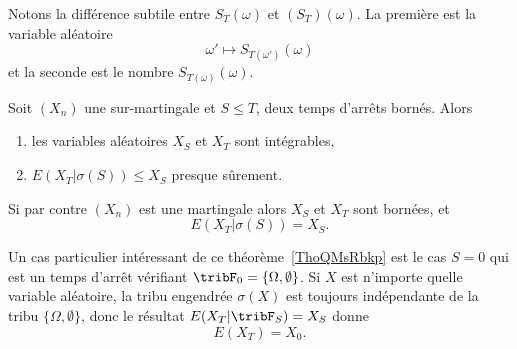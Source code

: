 \begin{remark}
    Notons la différence subtile entre \( S_T(\omega)\) et \( (S_T)(\omega)\). La première est la variable aléatoire
    \begin{equation}
        \omega'\mapsto S_{T(\omega')}(\omega)
    \end{equation}
    et la seconde est le nombre \( S_{T(\omega)}(\omega)\).
\end{remark}

\begin{theorem}   \label{ThoQMsRbkp}
    Soit \( (X_n)\) une sur-martingale et \( S\leq T\), deux temps d'arrêts bornés. Alors
    \begin{enumerate}
        \item
            les variables aléatoires \( X_{S}\) et \( X_{T}\) sont intégrables,
        \item
            \( E(X_{T}|  \sigma(S) )\leq X_{S}\) presque sûrement.
    \end{enumerate}
    Si par contre \( (X_n)\) est une martingale alors \( X_{S}\) et \( X_{T}\) sont bornées, et
    \begin{equation}
        E(X_{T}|\sigma(S))=X_{S}.
    \end{equation}
\end{theorem}
\begin{remark}  \label{RemKCdpnid}
Un cas particulier intéressant de ce théorème~\ref{ThoQMsRbkp} est le cas \( S=0\) qui est un temps d'arrêt vérifiant \( \tribF_0=\{ \Omega,\emptyset \}\). Si \( X\) est n'importe quelle variable aléatoire, la tribu engendrée \( \sigma(X)\) est toujours indépendante de la tribu \( \{ \Omega,\emptyset \}\), donc le résultat $E(X_T|\tribF_S)=X_S$ donne
\begin{equation}
    E(X_T)=X_0.
\end{equation}
\end{remark}


